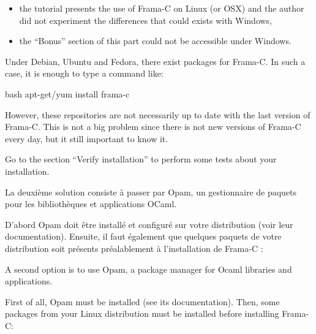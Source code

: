 \begin{Warning}
\begin{itemize}
  \item the tutorial presents the use of Frama-C on Linux (or OSX) and
    the author did not experiment the differences that could exists with Windows,
  \item the ``Bonus'' section of this part could not be accessible under Windows.
  \end{itemize}
\end{Warning}






Under Debian, Ubuntu and Fedora, there exist packages for Frama-C. In
such a case, it is enough to type a command like:



\begin{CodeBlock}{bash}
apt-get/yum install frama-c
\end{CodeBlock}



However, these repositories are not necessarily up to date with the last
version of Frama-C. This is not a big problem since there is not new
versions of Frama-C every day, but it still important to know it.



Go to the section ``Verify installation'' to perform some tests about
your installation.





La deuxième solution consiste à passer par Opam, un gestionnaire de paquets 
pour les bibliothèques et applications OCaml.



D'abord Opam doit être installé et configuré sur votre distribution (voir 
leur documentation). Ensuite, il faut également que quelques paquets de votre
distribution soit présents préalablement à l'installation de Frama-C :



A second option is to use Opam, a package manager for Ocaml libraries
and applications.



First of all, Opam must be installed (see its documentation). Then, some
packages from your Linux distribution must be installed before
installing Frama-C:




